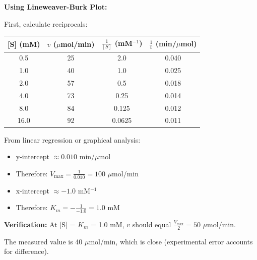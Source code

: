 \begin{solution}
\textbf{Using Lineweaver-Burk Plot:}

First, calculate reciprocals:
\begin{center}
\begin{tabular}{cccc}
\toprule
{[S] (mM)} & $v$ ($\mu$mol/min) & $\frac{1}{[S]}$ (mM$^{-1}$) & $\frac{1}{v}$ (min/$\mu$mol) \\
\midrule
0.5 & 25 & 2.0 & 0.040 \\
1.0 & 40 & 1.0 & 0.025 \\
2.0 & 57 & 0.5 & 0.018 \\
4.0 & 73 & 0.25 & 0.014 \\
8.0 & 84 & 0.125 & 0.012 \\
16.0 & 92 & 0.0625 & 0.011 \\
\bottomrule
\end{tabular}
\end{center}

From linear regression or graphical analysis:
\begin{itemize}
    \item y-intercept $\approx 0.010$ min/$\mu$mol
    \item Therefore: $V_{\max} = \frac{1}{0.010} = 100$ $\mu$mol/min
    \item x-intercept $\approx -1.0$ mM$^{-1}$
    \item Therefore: $K_m = -\frac{1}{-1.0} = 1.0$ mM
\end{itemize}

\textbf{Verification:} At [S] = $K_m$ = 1.0 mM, $v$ should equal $\frac{V_{\max}}{2} = 50$ $\mu$mol/min.

The measured value is 40 $\mu$mol/min, which is close (experimental error accounts for difference).
\end{solution}


